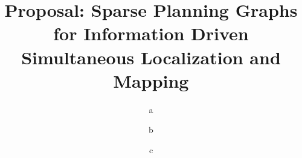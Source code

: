 \documentclass[]{article}
\begin{document}
\title{Proposal: Sparse Planning Graphs for Information Driven Simultaneous Localization and Mapping}
\author{a}
\author{b}
\author{c}

\maketitle






\end{document}
